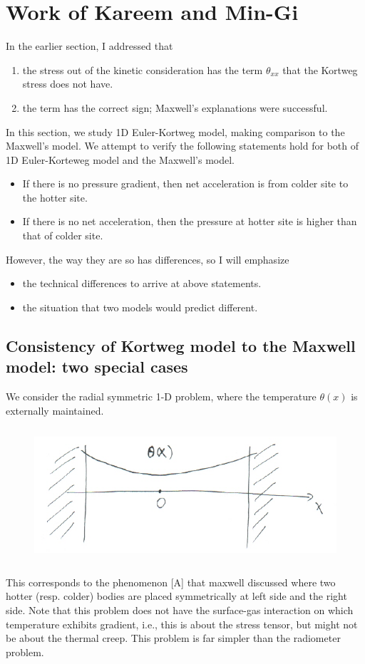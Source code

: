 \documentclass[a4paper,12pt]{article}
\begin{document}
\section{Work of Kareem and Min-Gi}
In the earlier section, I addressed that 
\begin{enumerate}
 \item the stress out of the kinetic consideration has the term $\theta_{xx}$ that the Kortweg stress does not have.
 \item the term has the correct sign; Maxwell's explanations were successful.
\end{enumerate}
In this section, we study 1D Euler-Kortweg model, making comparison to the Maxwell's model. We attempt to verify the following statements hold for both of 1D Euler-Korteweg model and the Maxwell's model.
 \begin{itemize}
  \item If there is no pressure gradient, then net acceleration is from colder site to the hotter site.
  \item If there is no net acceleration, then the pressure at hotter site is higher than that of colder site.
 \end{itemize}

However, the way they are so has differences, so I will emphasize
\begin{itemize}
 \item the technical differences to arrive at above statements. 
 \item the situation that two models would predict different.
\end{itemize}


\subsection{Consistency of Kortweg model to the Maxwell model: two special cases}
We consider the radial symmetric 1-D problem, where the temperature $\theta(x)$ is externally maintained.
 \begin{figure}[ht]
  \centering
  \includegraphics[height=5cm]{1Dmodel.png}
 \end{figure}
This corresponds to the phenomenon [A] that maxwell discussed where two hotter (resp. colder) bodies are placed symmetrically at left side and the right side. Note that this problem does not have the surface-gas interaction on which temperature exhibits gradient, i.e., this is about the stress tensor, but might not be about the thermal creep. This problem is far simpler than the radiometer problem.
\end{document}
